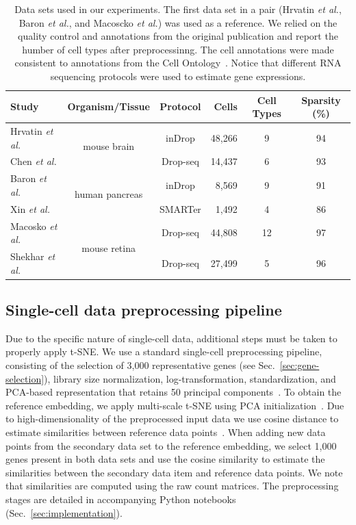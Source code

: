 \documentclass[runningheads]{llncs}
\newcommand{\etal}{\textit{et al.}}
\begin{document}
\vspace{-3mm}
\begin{table}[ht]
\begin{center}
\setlength\tabcolsep{4pt}
\begin{tabular}{l c c r c c}
\toprule
Study & Organism/Tissue & Protocol & Cells & Cell Types & Sparsity (\%) \\
\midrule
Hrvatin \etal & \multirow{2}{*}{mouse brain} & inDrop & 48,266 & 9 & 94 \\
Chen \etal & & Drop-seq & 14,437 & 6 & 93 \\[5pt]
Baron \etal & \multirow{2}{*}{human pancreas} & inDrop & 8,569 & 9 & 91 \\
Xin \etal & & SMARTer & 1,492 & 4 & 86 \\[5pt]
Macosko \etal & \multirow{2}{*}{mouse retina} & Drop-seq & 44,808 & 12 & 97 \\
Shekhar \etal & & Drop-seq & 27,499 & 5 & 96 \\
\bottomrule
\end{tabular}
\end{center}
\caption{Data sets used in our experiments. The first data set in a pair
(Hrvatin \etal, Baron \etal, and Macoscko \etal) was used as a reference.  We
relied on the quality control and annotations from the original publication
and report the humber of cell types after preprocessinng.  The cell
annotations were made consistent to annotations from the Cell
Ontology~\cite{cell_ontology}. Notice that different RNA sequencing protocols
were used to estimate gene expressions.}
\label{tab:data sets}
\end{table}

\subsection{Single-cell data preprocessing pipeline}

Due to the specific nature of single-cell data, additional steps must be taken
to properly apply t-SNE. We use a standard single-cell preprocessing pipeline,
consisting of the selection of 3,000 representative genes (see
Sec.~\ref{sec:gene-selection}), library size normalization, log-transformation,
standardization, and PCA-based representation that retains 50 principal
components~\cite{seurat,scanpy}. To obtain the reference embedding, we apply
multi-scale t-SNE using PCA initialization~\cite{art_of_using_tsne}. Due to
high-dimensionality of the preprocessed input data we use cosine distance to
estimate similarities between reference data points~\cite{Domingos2012-CACM}.
When adding new data points from the secondary data set to the reference
embedding, we select 1,000 genes present in both data sets and use the cosine
similarity to estimate the similarities between the secondary data item and
reference data points. We note that similarities are computed using the raw
count matrices. The preprocessing stages are detailed in accompanying Python
notebooks (Sec.~\ref{sec:implementation}).
\end{document}
